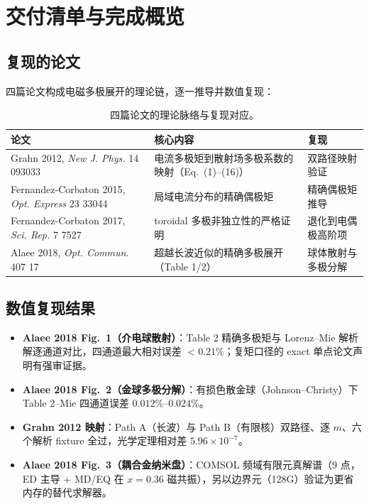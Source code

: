 \section{交付清单与完成概览}

\subsection{复现的论文}

四篇论文构成电磁多极展开的理论链，逐一推导并数值复现：

\begin{table}[H]
\centering
\small
\begin{tabularx}{\textwidth}{p{4.2cm}X p{2.6cm}}
\toprule
论文 & 核心内容 & 复现 \\
\midrule
Grahn 2012, \emph{New J. Phys.} 14 093033 & 电流多极矩到散射场多极系数的映射（Eq.~(1)--(16)） & 双路径映射验证 \\
Fernandez-Corbaton 2015, \emph{Opt. Express} 23 33044 & 局域电流分布的精确偶极矩 & 精确偶极矩推导 \\
Fernandez-Corbaton 2017, \emph{Sci. Rep.} 7 7527 & toroidal 多极非独立性的严格证明 & 退化到电偶极高阶项 \\
Alaee 2018, \emph{Opt. Commun.} 407 17 & 超越长波近似的精确多极展开（Table 1/2） & 球体散射与多极分解 \\
\bottomrule
\end{tabularx}
\caption{四篇论文的理论脉络与复现对应。}
\label{tab:papers}
\end{table}

\subsection{数值复现结果}

\begin{itemize}
  \item \textbf{Alaee 2018 Fig.~1（介电球散射）}：Table 2 精确多极矩与 Lorenz--Mie 解析解逐通道对比，四通道最大相对误差 $<0.21\%$；复矩口径的 exact 单点论文声明有强审证据。
  \item \textbf{Alaee 2018 Fig.~2（金球多极分解）}：有损色散金球（Johnson--Christy）下 Table 2--Mie 四通道误差 $0.012\%$--$0.024\%$。
  \item \textbf{Grahn 2012 映射}：Path A（长波）与 Path B（有限核）双路径、逐 $m$、六个解析 fixture 全过，光学定理相对差 $5.96\times10^{-7}$。
  \item \textbf{Alaee 2018 Fig.~3（耦合金纳米盘）}：COMSOL 频域有限元真解谱（9 点，ED 主导 + MD/EQ 在 $x=0.36$ 磁共振），另以边界元（128G）验证为更省内存的替代求解器。
\end{itemize}

